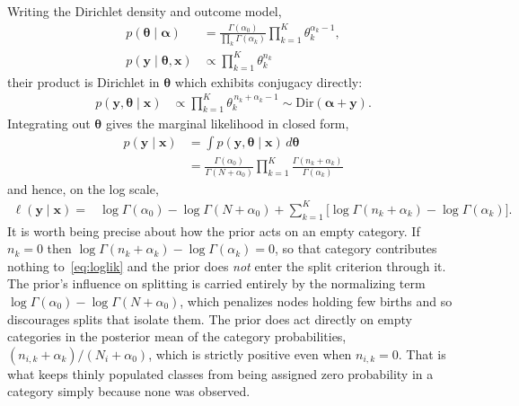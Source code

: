 \documentclass[AMA]{USG}
\begin{document}
Writing the Dirichlet density and outcome model,
\begin{align*}
  p(\boldsymbol{\theta}\mid\boldsymbol{\alpha})
    &= \frac{\Gamma(\alpha_0)}{\prod_{k}\Gamma(\alpha_k)}
       \prod_{k=1}^{K}\theta_k^{\alpha_k-1},\\
    p(\mathbf{y}\mid\boldsymbol{\theta}, \mathbf{x})
      &\propto \prod_{k=1}^{K}\theta_k^{n_k}
\end{align*}
their product is Dirichlet in \(\boldsymbol{\theta}\) which exhibits conjugacy directly:
\begin{align*}
  p(\mathbf{y},\boldsymbol{\theta}\mid\mathbf{x})
    &\propto \prod_{k=1}^{K}\theta_k^{\,n_k+\alpha_k-1}
     \sim \mathrm{Dir}(\boldsymbol{\alpha}+\mathbf{y}).
\end{align*}
Integrating out \(\boldsymbol{\theta}\) gives the marginal likelihood in closed form,
\begin{align*}
  p(\mathbf{y}\mid\mathbf{x})
    &= \int p(\mathbf{y},\boldsymbol{\theta}\mid\mathbf{x})\,
       d\boldsymbol{\theta}\\
     &= \frac{\Gamma(\alpha_0)}{\Gamma(N+\alpha_0)}
       \prod_{k=1}^{K}\frac{\Gamma(n_k+\alpha_k)}{\Gamma(\alpha_k)}
\end{align*}
and hence, on the log scale,
\begin{equation}
\label{eq:loglik}
\begin{split}
  \ell(\mathbf{y}\mid\mathbf{x})
    =& \log\Gamma(\alpha_0)-\log\Gamma(N+\alpha_0)
       +\sum_{k=1}^{K}\bigl[\log\Gamma(n_k+\alpha_k)-\log\Gamma(\alpha_k)\bigr].
\end{split}
\end{equation}
It is worth being precise about how the prior acts on an empty category. If \(n_k = 0\) then \(\log\Gamma(n_k+\alpha_k) - \log\Gamma(\alpha_k) = 0\), so that category contributes nothing to~\eqref{eq:loglik} and the prior does \emph{not} enter the split criterion through it. The prior's influence on splitting is carried entirely by the normalizing term \(\log\Gamma(\alpha_0) - \log\Gamma(N+\alpha_0)\), which penalizes nodes holding few births and so discourages splits that isolate them. The prior does act directly on empty categories in the posterior mean of the category probabilities, \((n_{i,k}+\alpha_k)/(N_i+\alpha_0)\), which is strictly positive even when \(n_{i,k}=0\). That is what keeps thinly populated classes from being assigned zero probability in a category simply because none was observed.
\end{document}
